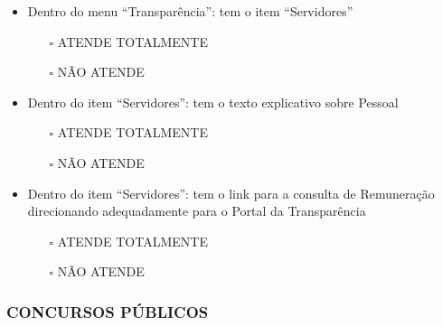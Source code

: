 \documentclass[
]{book}
\providecommand{\tightlist}{%
  \setlength{\itemsep}{0pt}\setlength{\parskip}{0pt}}
\begin{document}
\begin{itemize}
\tightlist
\item
  Dentro do menu ``Transparência'': tem o item ``Servidores''

  \begin{itemize}
  \tightlist
  \item[$\square$]
    ATENDE TOTALMENTE
  \item[$\square$]
    NÃO ATENDE
  \end{itemize}
\item
  Dentro do item ``Servidores'': tem o texto explicativo sobre Pessoal

  \begin{itemize}
  \tightlist
  \item[$\square$]
    ATENDE TOTALMENTE
  \item[$\square$]
    NÃO ATENDE
  \end{itemize}
\item
  Dentro do item ``Servidores'': tem o link para a consulta de Remuneração direcionando adequadamente para o Portal da Transparência

  \begin{itemize}
  \tightlist
  \item[$\square$]
    ATENDE TOTALMENTE
  \item[$\square$]
    NÃO ATENDE
  \end{itemize}
\end{itemize}

\hypertarget{concursos-puxfablicos-1}{%
\subsubsection*{CONCURSOS PÚBLICOS}\label{concursos-puxfablicos-1}}
\end{document}
